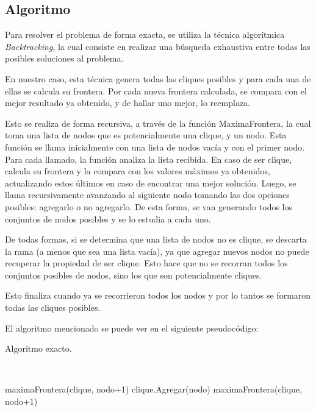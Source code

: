 \subsection{Algoritmo}
Para resolver el problema de forma exacta, se utiliza la técnica algorítmica \textit{Backtracking}, la cual consiste en realizar una búsqueda exhaustiva entre todas las posibles soluciones al problema.

En nuestro caso, esta técnica genera todas las cliques posibles y para cada una de ellas se calcula su frontera. Por cada nueva frontera calculada, se compara con el mejor resultado ya obtenido, y de hallar uno mejor, lo reemplaza.

Esto se realiza de forma recursiva, a través de la función MaximaFrontera, la cual toma una lista de nodos que es potencialmente una clique, y un nodo. Esta función se llama inicialmente con una lista de nodos vacía y con el primer nodo. Para cada llamado, la función analiza la lista recibida. En caso de ser clique, calcula su frontera y la compara con los valores máximos ya obtenidos, actualizando estos últimos en caso de encontrar una mejor solución. Luego, se llama recursivamente avanzando al siguiente nodo tomando las dos opciones posibles: agregarlo o no agregarlo. De esta forma, se van generando todos los conjuntos de nodos posibles y se lo estudia a cada uno.

De todas formas, si se determina que una lista de nodos no es clique, se descarta la rama (a menos que sea una lista vacía), ya que agregar nuevos nodos no puede recuperar la propiedad de ser clique. Esto hace que no se recorran todos los conjuntos posibles de nodos, sino los que son potencialmente cliques.

Esto finaliza cuando ya se recorrieron todos los nodos y por lo tantos se formaron todas las cliques posibles.

El algoritmo mencionado se puede ver en el siguiente pseudocódigo:

\begin{algorithm}[H]
\begin{algorithmic}
\caption{Algoritmo exacto.}
	 \\
		\State{}
		
		\State{}
		
		\State{}
		maximaFrontera(clique, nodo+1) \;
		clique.Agregar(nodo) \;
		maximaFrontera(clique, nodo+1) \;
	\EndFunction
\end{algorithmic}
\end{algorithm}

